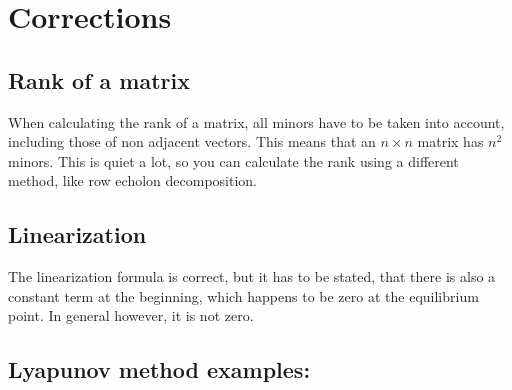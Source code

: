 
\chapter{Corrections}
    \section{Rank of a matrix}
    When calculating the rank of a matrix, all minors have to be taken into account, including those of non adjacent vectors. This means that an $n\times n$ matrix has  $n^{2}$ minors. This is quiet a lot, so you can calculate the rank using a different method, like row echolon decomposition. 
    \section{Linearization}
        The linearization formula is correct, but it has to be stated, that there is also a constant term at the beginning, which happens to be zero at the 
        equilibrium point. In general however, it is not zero.

    \section{Lyapunov method examples:}

